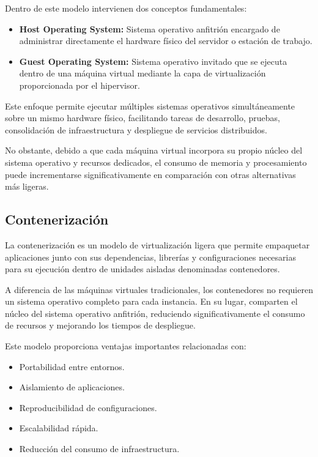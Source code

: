 Dentro de este modelo intervienen dos conceptos fundamentales:

\begin{itemize}
\item \textbf{Host Operating System:} Sistema operativo anfitrión encargado de administrar directamente el hardware físico del servidor o estación de trabajo.

\item \textbf{Guest Operating System:} Sistema operativo invitado que se ejecuta dentro de una máquina virtual mediante la capa de virtualización proporcionada por el hipervisor.
\end{itemize}

Este enfoque permite ejecutar múltiples sistemas operativos simultáneamente sobre un mismo hardware físico, facilitando tareas de desarrollo, pruebas, consolidación de infraestructura y despliegue de servicios distribuidos.

No obstante, debido a que cada máquina virtual incorpora su propio núcleo del sistema operativo y recursos dedicados, el consumo de memoria y procesamiento puede incrementarse significativamente en comparación con otras alternativas más ligeras.

\subsection{Contenerización}

La contenerización es un modelo de virtualización ligera que permite empaquetar aplicaciones junto con sus dependencias, librerías y configuraciones necesarias para su ejecución dentro de unidades aisladas denominadas contenedores.

A diferencia de las máquinas virtuales tradicionales, los contenedores no requieren un sistema operativo completo para cada instancia. En su lugar, comparten el núcleo del sistema operativo anfitrión, reduciendo significativamente el consumo de recursos y mejorando los tiempos de despliegue.

Este modelo proporciona ventajas importantes relacionadas con:

\begin{itemize}
\item Portabilidad entre entornos.
\item Aislamiento de aplicaciones.
\item Reproducibilidad de configuraciones.
\item Escalabilidad rápida.
\item Reducción del consumo de infraestructura.
\end{itemize}

